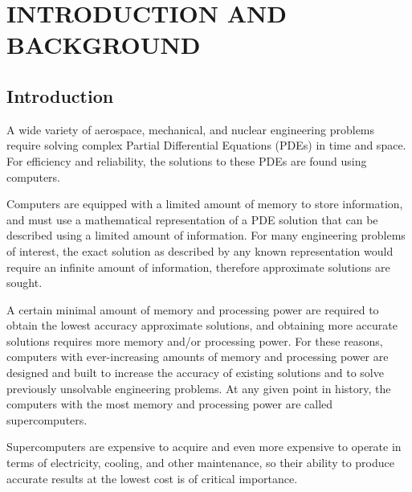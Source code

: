 
\chapter{INTRODUCTION AND BACKGROUND}
\let\thefootnote\relax{}
\label{chap:intro}

\section{Introduction}
\label{sec:intro}

A wide variety of aerospace, mechanical, and nuclear engineering
problems require solving complex Partial Differential
Equations (PDEs) in time and space.
For efficiency and reliability, the solutions to these PDEs are
found using computers.

Computers are equipped with a limited amount of memory to
store information, and must use a mathematical representation
of a PDE solution that can be described using
a limited amount of information.
For many engineering problems of interest, the exact solution
as described by any known representation would require an
infinite amount of information, therefore approximate
solutions are sought.

A certain minimal amount of memory and processing power
are required to obtain the lowest accuracy approximate
solutions, and obtaining more accurate solutions requires
more memory and/or processing power.
For these reasons, computers with ever-increasing amounts
of memory and processing power are designed and built to
increase the accuracy of existing solutions and
to solve previously unsolvable engineering problems.
At any given point in history, the computers with the
most memory and processing power are called supercomputers.

Supercomputers are expensive to acquire and even more
expensive to operate in terms of electricity, cooling, and other
maintenance, so their ability to
produce accurate results at the lowest cost
is of critical importance.

